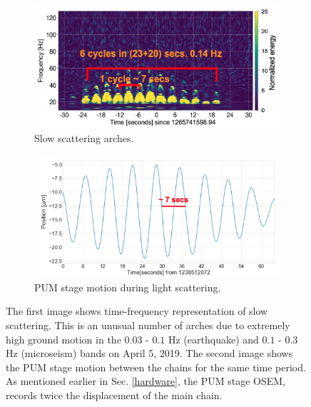 \documentclass[12pt]{iopart}
\begin{document}
\begin{figure}[h]
\captionsetup[subfigure]{font=scriptsize,labelfont=scriptsize}
   \centering
    \begin{subfigure}[b]{0.45\textwidth}
        \centering
         \includegraphics[width= \textwidth]{slow_arch2.png}
         \caption{Slow scattering arches.}
         \label{fig:slowscat}
    \end{subfigure}
    \hfill
    \begin{subfigure}[b]{0.45\textwidth}
        \centering
         \includegraphics[width =\textwidth]{ts_sus2.png}
         \caption{PUM stage motion during light scattering.}
         \label{fig:timeseriessus}
         
    
    \end{subfigure}
    \caption{The first image shows time-frequency representation of  slow scattering. This is an unusual number of arches due to extremely high ground motion in the $0.03$ - $0.1$ Hz (earthquake) and $0.1$ - $0.3$  Hz (microseism) bands on April 5, 2019. The second image shows the PUM stage motion between the chains for the same time period. As mentioned earlier in Sec. \ref{hardware}, the PUM stage OSEM, records twice the displacement of the main chain.}
    \label{fig:slowscat_sus}
    
\end{figure}
\end{document}

